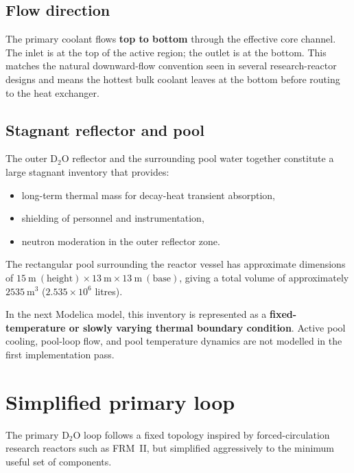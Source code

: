\documentclass[11pt]{article}
\begin{document}
% 
\subsection{Flow direction}

The primary coolant flows \textbf{top to bottom} through the effective
core channel.  The inlet is at the top of the active region; the outlet
is at the bottom.  This matches the natural downward-flow convention seen
in several research-reactor designs and means the hottest bulk coolant
leaves at the bottom before routing to the heat exchanger.

\subsection{Stagnant reflector and pool}

The outer D$_2$O reflector and the surrounding pool water together
constitute a large stagnant inventory that provides:
\begin{itemize}
  \item long-term thermal mass for decay-heat transient absorption,
  \item shielding of personnel and instrumentation,
  \item neutron moderation in the outer reflector zone.
\end{itemize}

The rectangular pool surrounding the reactor vessel has approximate
dimensions of $15\ \mathrm{m}\ (\mathrm{height}) \times
13\ \mathrm{m} \times 13\ \mathrm{m}\ (\mathrm{base})$, giving a total
volume of approximately $2535\ \mathrm{m^3}$ ($2.535 \times 10^6$
litres).

In the next Modelica model, this inventory is represented as a
\textbf{fixed-temperature or slowly varying thermal boundary condition}.
Active pool cooling, pool-loop flow, and pool temperature dynamics are
not modelled in the first implementation pass.


\section{Simplified primary loop}

The primary D$_2$O loop follows a fixed topology inspired by
forced-circulation research reactors such as FRM~II, but simplified
aggressively to the minimum useful set of components.
\end{document}
